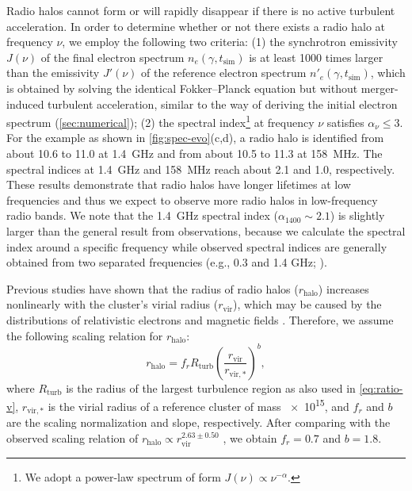 \documentclass[twocolumn]{aastex62}
\newcommand{\R}[1]{\mathrm{#1}}
\begin{document}
Radio halos cannot form or will rapidly disappear if there is no active
turbulent acceleration.
In order to determine whether or not there exists a radio halo at frequency
$\nu$, we employ the following two criteria:
(1) the synchrotron emissivity $J(\nu)$ of the final electron spectrum
$n_e(\gamma, t_{\R{sim}})$ is at least \num{1000} times larger than the
emissivity $J'(\nu)$ of the reference electron spectrum
$n'_e(\gamma, t_{\R{sim}})$, which is obtained by solving the identical
Fokker--Planck equation but without merger-induced turbulent acceleration,
similar to the way of deriving the initial electron spectrum
(\autoref{sec:numerical});
(2) the spectral index\footnote{%
  We adopt a power-law spectrum of form $J(\nu) \propto \nu^{-\alpha}$.}
at frequency $\nu$ satisfies $\alpha_{\nu} \le 3$.
For the example as shown in \autoref{fig:spec-evo}(c,d), a radio halo
is identified from about 10.6 to 11.0 \si{\Gyr} at \SI{1.4}{\GHz} and
from about 10.5 to 11.3 \si{\Gyr} at \SI{158}{\MHz}.
The spectral indices at \SI{1.4}{\GHz} and \SI{158}{\MHz} reach about 2.1
and 1.0, respectively.
These results demonstrate that radio halos have longer lifetimes at low
frequencies and thus we expect to observe more radio halos in
low-frequency radio bands.
We note that the \SI{1.4}{\GHz} spectral index ($\alpha_{1400} \sim 2.1$)
is slightly larger than the general result from observations,
because we calculate the spectral index around a specific frequency while
observed spectral indices are generally obtained from two separated
frequencies (e.g., 0.3 and 1.4 GHz; \citealt{feretti2012rev}).

Previous studies \citep[e.g.,][]{cassano2007,basu2012}
have shown that the radius of radio halos ($r_{\R{halo}}$)
increases nonlinearly with the cluster's virial radius ($r_{\R{vir}}$),
which may be caused by the distributions of relativistic electrons and
magnetic fields \citep[e.g.,][]{dolag2002}.
Therefore, we assume the following scaling relation for $r_{\R{halo}}$:
\begin{equation}
  \label{eq:r-halo}
  r_{\R{halo}} = f_r R_{\R{turb}}
    \left( \frac{r_{\R{vir}}}{r_{\R{vir,*}}} \right)^b ,
\end{equation}
where
$R_{\R{turb}}$ is the radius of the largest turbulence region as also used
in \autoref{eq:ratio-v},
$r_{\R{vir,*}}$ is the virial radius of a reference cluster of mass
\SI{e15}{\solarmass},
and $f_r$ and $b$ are the scaling normalization and slope, respectively.
After comparing with the observed scaling relation of
$r_{\R{halo}} \propto r_{\R{vir}}^{2.63 \pm 0.50}$ \citep{cassano2007},
we obtain $f_r = 0.7$ and $b = 1.8$.
\end{document}
